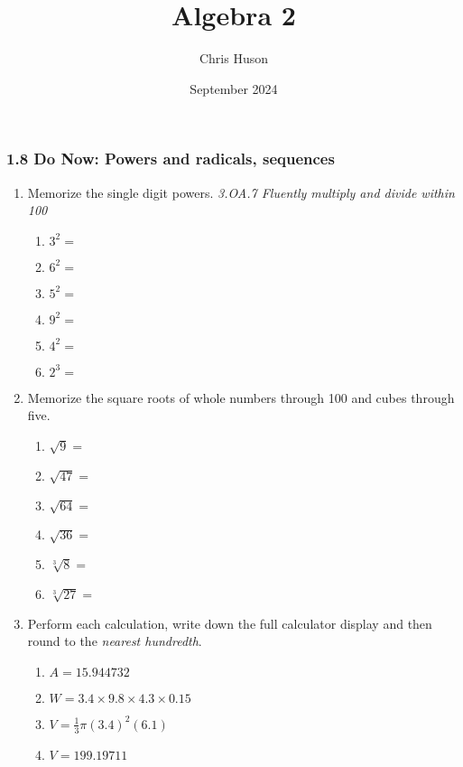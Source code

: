 \documentclass[12pt, twoside]{article}
\title{Algebra 2}
\author{Chris Huson}
\date{September 2024}
\begin{document}
\subsubsection*{1.8 Do Now: Powers and radicals, sequences}
\begin{enumerate}[itemsep=0.5cm]

\item Memorize the single digit powers. \hfill \emph{3.OA.7 Fluently multiply and divide within 100}
    \begin{multicols}{2}
        \begin{enumerate}[itemsep=0.5cm]
            \item $3^2 =$
            \item $6^2 =$
            \item $5^2 =$
            \item $9^2 =$
            \item $4^2 =$
            \item $2^3 =$
        \end{enumerate}
    \end{multicols}

\item Memorize the square roots of whole numbers through 100 and cubes through five.
    \begin{multicols}{2}
        \begin{enumerate}[itemsep=0.5cm]
            \item $\sqrt{9} =$
            \item $\sqrt{47} =$
            \item $\sqrt{64} =$
            \item $\sqrt{36} =$
            \item $\sqrt[3]{8} =$
            \item $\sqrt[3]{27} =$
          \end{enumerate}
    \end{multicols} \vspace{0.25cm}


\item Perform each calculation, write down the full calculator display and then round to the \emph{nearest hundredth}.
    \begin{multicols}{2}
    \begin{enumerate}[itemsep=1.5cm]
      \item $A=15.944732$
      \item $W=3.4 \times 9.8 \times 4.3 \times 0.15$
      \item $V=\frac{1}{3} \pi (3.4)^2(6.1)$
      \item $V=199.19711$
    \end{enumerate}
    \end{multicols} \vspace{1cm}


\end{enumerate}
\end{document}
